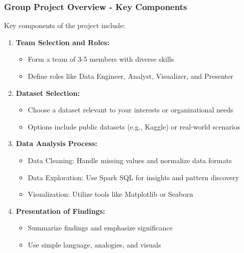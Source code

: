 \documentclass[aspectratio=169]{beamer}
\begin{document}
\begin{frame}[fragile]
  \frametitle{Group Project Overview - Key Components}
  Key components of the project include:
  \begin{enumerate}
    \item \textbf{Team Selection and Roles:}
      \begin{itemize}
        \item Form a team of 3-5 members with diverse skills
        \item Define roles like Data Engineer, Analyst, Visualizer, and Presenter
      \end{itemize}

    \item \textbf{Dataset Selection:}
      \begin{itemize}
        \item Choose a dataset relevant to your interests or organizational needs
        \item Options include public datasets (e.g., Kaggle) or real-world scenarios
      \end{itemize}

    \item \textbf{Data Analysis Process:}
      \begin{itemize}
        \item Data Cleaning: Handle missing values and normalize data formats
        \item Data Exploration: Use Spark SQL for insights and pattern discovery
        \item Visualization: Utilize tools like Matplotlib or Seaborn
      \end{itemize}

    \item \textbf{Presentation of Findings:}
      \begin{itemize}
        \item Summarize findings and emphasize significance
        \item Use simple language, analogies, and visuals
      \end{itemize}
  \end{enumerate}
\end{frame}
\end{document}
